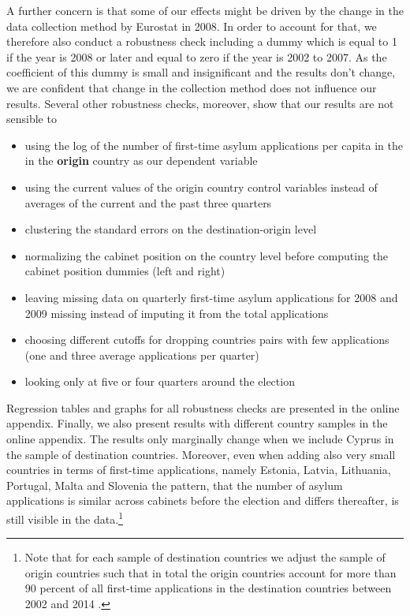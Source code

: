 \documentclass[a4paper,12pt]{article}
\begin{document}
A further concern is that some of our effects might be driven by the change in the data collection method by Eurostat in 2008. In order to account for that, we therefore also conduct a robustness check including a dummy which is equal to 1 if the year is 2008 or later and equal to zero if the year is 2002 to 2007. As the coefficient of this dummy is small and insignificant and the results don't change, we are confident that change in the collection method does not influence our results.  Several other robustness checks, moreover,  show that our results are not sensible to
\begin{itemize}
\itemsep0em 
\item  using the log of the number of first-time asylum applications per capita in the in the \textbf{origin} country as our dependent variable 
\item using  the current values of the origin country control variables instead of averages of the current and the past three quarters 
\item clustering the standard errors on the destination-origin level
\item normalizing the cabinet position on the country level before computing the cabinet position dummies (left and right)
\item leaving missing data on quarterly  first-time asylum applications for 2008 and 2009 missing instead of imputing it from the total applications
\item choosing  different cutoffs  for dropping countries pairs with few applications (one and three average applications per quarter)
\item looking only at five or four quarters around the election 
\end{itemize}
Regression tables and graphs for all robustness checks are presented in the online appendix. Finally, we also present results with different country samples in the online appendix. The results only marginally change when we include Cyprus in the sample of destination countries. Moreover, even when adding also very small countries in terms of first-time applications, namely Estonia, Latvia, Lithuania, Portugal, Malta and Slovenia the pattern, that the number of asylum applications is similar across cabinets before the election and differs thereafter, is still visible in the data.\footnote{Note that for each sample of destination countries we adjust the sample of origin countries such that in total the origin countries account for more than 90 percent of all first-time applications in the destination countries between 2002 and 2014 . }  
% 
% 
\end{document}
